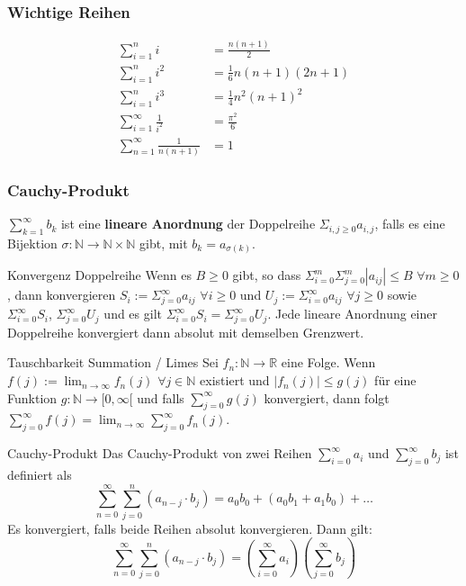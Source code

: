 \documentclass[a4paper,10pt]{article}
\def\limn{\lim_{n\to \infty}}
\def\sumk{\sum_{k=1}^\infty}
\begin{document}
\subsubsection{Wichtige Reihen}
\begin{align*}
 \sum_{i=1}^n i &= \frac{n(n+1)}{2} \\
 \sum_{i=1}^n i^2 &= \frac{1}{6}n(n+1)(2n+1) \\
 \sum_{i=1}^n i^3 &= \frac{1}{4}n^2(n+1)^2 \\
 \sum_{i=1}^\infty \frac{1}{i^2} &= \frac{\pi^2}{6} \\
 \sum_{n=1}^\infty \frac{1}{n(n+1)} &= 1
\end{align*}

\subsubsection{Cauchy-Produkt}
$\sumk b_k$ ist eine \textbf{lineare Anordnung} der Doppelreihe $\Sigma_{i,j \geq 0} a_{i,j}$, falls es eine Bijektion $\sigma : \mathbb{N} \rightarrow \mathbb{N} \times \mathbb{N}$ gibt, mit $b_k = a_{\sigma(k)}$.\\

\begin{subbox}{Konvergenz Doppelreihe}
  Wenn es $B \geq 0$ gibt, so dass $\Sigma_{i=0}^m \Sigma_{j=0}^m |a_{ij}| \leq B$ $\forall m \geq 0$, dann konvergieren $S_i := \Sigma_{j=0}^\infty a_{ij}$ $\forall i \geq 0$ und $U_j := \Sigma_{i=0}^\infty a_{ij}$ $\forall j \geq 0$ sowie $\Sigma_{i=0}^\infty S_i$, $\Sigma_{j=0}^\infty U_j$ und es gilt $\Sigma_{i=0}^\infty S_i = \Sigma_{j=0}^\infty U_j$. Jede lineare Anordnung einer Doppelreihe konvergiert dann absolut mit demselben Grenzwert.
\end{subbox}

\begin{subbox}{Tauschbarkeit Summation / Limes}
  Sei $f_n : \mathbb{N} \rightarrow \mathbb{R}$ eine Folge. Wenn $f(j) := \limn f_n(j)$ $\forall j \in \mathbb{N}$ existiert und $|f_n(j)| \leq g(j)$ für eine Funktion $g: \mathbb{N} \rightarrow \mathbb [0, \infty[$ und falls $\sum_{j=0}^\infty g(j)$ konvergiert, dann folgt $\sum_{j=0}^\infty f(j) = \limn \sum_{j=0}^\infty f_n(j)$.
\end{subbox}

\begin{mainbox}{Cauchy-Produkt}
  Das Cauchy-Produkt von zwei Reihen $\sum_{i = 0}^\infty a_i$ und $\sum_{j = 0}^\infty b_j$ ist definiert als
  $$\sum_{n=0}^\infty \sum_{j=0}^n (a_{n-j} \cdot b_j) = a_0b_0 + (a_0b_1 + a_1b_0) + \ldots$$ Es konvergiert, falls beide Reihen absolut konvergieren. Dann gilt:\\
  $$\sum_{n=0}^\infty \sum_{j=0}^n (a_{n-j} \cdot b_j) = \left( \sum_{i=0}^\infty a_i \right) \left( \sum_{j=0}^\infty b_j \right)$$
\end{mainbox}
\end{document}
